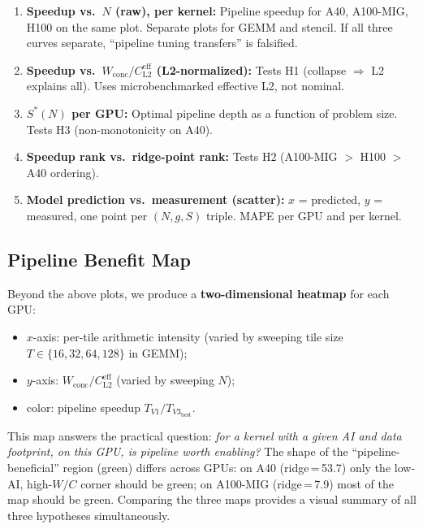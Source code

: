 \documentclass[sigplan,nonacm,10pt]{acmart}
\begin{document}
\begin{enumerate}
\item \textbf{Speedup vs.\ $N$ (raw), per kernel:}
  Pipeline speedup for A40, A100-MIG, H100 on the same plot.
  Separate plots for GEMM and stencil.
  If all three curves separate, ``pipeline tuning transfers'' is
  falsified.

\item \textbf{Speedup vs.\ $W_{\text{conc}}/C_{\text{L2}}^{\text{eff}}$
  (L2-normalized):}
  Tests H1 (collapse $\Rightarrow$ L2 explains all).
  Uses microbenchmarked effective L2, not nominal.

\item \textbf{$S^*(N)$ per GPU:}
  Optimal pipeline depth as a function of problem size.
  Tests H3 (non-monotonicity on A40).

\item \textbf{Speedup rank vs.\ ridge-point rank:}
  Tests H2 (A100-MIG $>$ H100 $>$ A40 ordering).

\item \textbf{Model prediction vs.\ measurement (scatter):}
  $x$ = predicted, $y$ = measured, one point per $(N, g, S)$ triple.
  MAPE per GPU and per kernel.
\end{enumerate}

\subsection{Pipeline Benefit Map}
\label{sec:heatmap}

Beyond the above plots, we produce a \textbf{two-dimensional heatmap}
for each GPU:
\begin{itemize}
\item $x$-axis: per-tile arithmetic intensity (varied by sweeping tile
  size $T \in \{16, 32, 64, 128\}$ in GEMM);
\item $y$-axis: $W_{\text{conc}} / C_{\text{L2}}^{\text{eff}}$
  (varied by sweeping $N$);
\item color: pipeline speedup $T_{V1}/T_{V3_{\text{best}}}$.
\end{itemize}

This map answers the practical question: \emph{for a kernel with a
given AI and data footprint, on this GPU, is pipeline worth enabling?}
The shape of the ``pipeline-beneficial'' region (green) differs across
GPUs:
on A40 (ridge\,=\,53.7) only the low-AI, high-$W/C$ corner should be
green;
on A100-MIG (ridge\,=\,7.9) most of the map should be green.
Comparing the three maps provides a visual summary of all three
hypotheses simultaneously.
\end{document}
